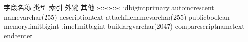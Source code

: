 {}\markdownRendererPipe{} 字段名称 \markdownRendererPipe{} 类型 \markdownRendererPipe{} 索引 \markdownRendererPipe{} 外键 \markdownRendererPipe{} 其他 \markdownRendererPipe{} \markdownRendererPipe{}:-:\markdownRendererPipe{}:-:\markdownRendererPipe{}:-:\markdownRendererPipe{}:-:\markdownRendererPipe{} \markdownRendererPipe{}id\markdownRendererPipe{}bigint\markdownRendererPipe{}primary\markdownRendererPipe{}\markdownRendererPipe{} auto\markdownRendererBackslash{}\markdownRendererUnderscore{}increscent\markdownRendererPipe{} \markdownRendererPipe{}name\markdownRendererPipe{}varchar(255)\markdownRendererPipe{}\markdownRendererPipe{}\markdownRendererPipe{}\markdownRendererPipe{} \markdownRendererPipe{}description\markdownRendererPipe{}text\markdownRendererPipe{}\markdownRendererPipe{}\markdownRendererPipe{}\markdownRendererPipe{} \markdownRendererPipe{}attach\markdownRendererBackslash{}\markdownRendererUnderscore{}file\markdownRendererBackslash{}\markdownRendererUnderscore{}name\markdownRendererPipe{}varchar(255)\markdownRendererPipe{}\markdownRendererPipe{}\markdownRendererPipe{}\markdownRendererPipe{} \markdownRendererPipe{}public\markdownRendererPipe{}boolean\markdownRendererPipe{}\markdownRendererPipe{}\markdownRendererPipe{}\markdownRendererPipe{} \markdownRendererPipe{}memory\markdownRendererBackslash{}\markdownRendererUnderscore{}limit\markdownRendererPipe{}bigint\markdownRendererPipe{}\markdownRendererPipe{}\markdownRendererPipe{}\markdownRendererPipe{} \markdownRendererPipe{}time\markdownRendererBackslash{}\markdownRendererUnderscore{}limit\markdownRendererPipe{}bigint\markdownRendererPipe{}\markdownRendererPipe{}\markdownRendererPipe{}\markdownRendererPipe{} \markdownRendererPipe{}build\markdownRendererBackslash{}\markdownRendererUnderscore{}arg\markdownRendererPipe{}varchar(2047)\markdownRendererPipe{}\markdownRendererPipe{}\markdownRendererPipe{}\markdownRendererPipe{} \markdownRendererPipe{}compare\markdownRendererBackslash{}\markdownRendererUnderscore{}script\markdownRendererBackslash{}\markdownRendererUnderscore{}name\markdownRendererPipe{}text\markdownRendererPipe{}\markdownRendererPipe{}\markdownRendererPipe{}\markdownRendererPipe{}\markdownRendererInterblockSeparator
{}\markdownRendererBackslash{}end\markdownRendererLeftBrace{}center\markdownRendererRightBrace{}\markdownRendererDocumentEnd
